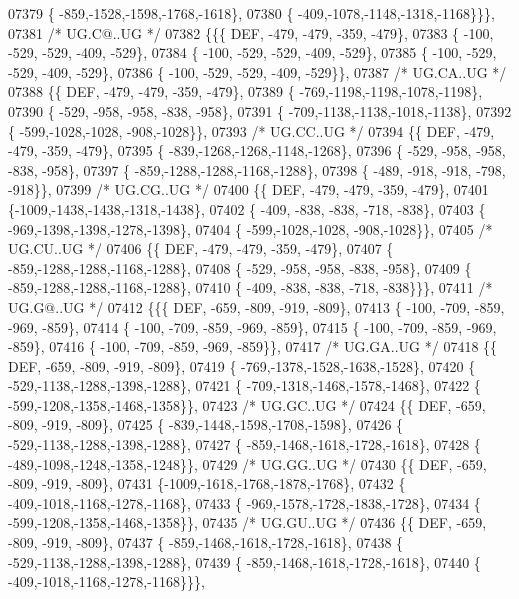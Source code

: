 \begin{DoxyCode}
07379 \{ -859,-1528,-1598,-1768,-1618\},
07380 \{ -409,-1078,-1148,-1318,-1168\}\}\},
07381 \textcolor{comment}{/* UG.C@..UG */}
07382 \{\{\{  DEF, -479, -479, -359, -479\},
07383 \{ -100, -529, -529, -409, -529\},
07384 \{ -100, -529, -529, -409, -529\},
07385 \{ -100, -529, -529, -409, -529\},
07386 \{ -100, -529, -529, -409, -529\}\},
07387 \textcolor{comment}{/* UG.CA..UG */}
07388 \{\{  DEF, -479, -479, -359, -479\},
07389 \{ -769,-1198,-1198,-1078,-1198\},
07390 \{ -529, -958, -958, -838, -958\},
07391 \{ -709,-1138,-1138,-1018,-1138\},
07392 \{ -599,-1028,-1028, -908,-1028\}\},
07393 \textcolor{comment}{/* UG.CC..UG */}
07394 \{\{  DEF, -479, -479, -359, -479\},
07395 \{ -839,-1268,-1268,-1148,-1268\},
07396 \{ -529, -958, -958, -838, -958\},
07397 \{ -859,-1288,-1288,-1168,-1288\},
07398 \{ -489, -918, -918, -798, -918\}\},
07399 \textcolor{comment}{/* UG.CG..UG */}
07400 \{\{  DEF, -479, -479, -359, -479\},
07401 \{-1009,-1438,-1438,-1318,-1438\},
07402 \{ -409, -838, -838, -718, -838\},
07403 \{ -969,-1398,-1398,-1278,-1398\},
07404 \{ -599,-1028,-1028, -908,-1028\}\},
07405 \textcolor{comment}{/* UG.CU..UG */}
07406 \{\{  DEF, -479, -479, -359, -479\},
07407 \{ -859,-1288,-1288,-1168,-1288\},
07408 \{ -529, -958, -958, -838, -958\},
07409 \{ -859,-1288,-1288,-1168,-1288\},
07410 \{ -409, -838, -838, -718, -838\}\}\},
07411 \textcolor{comment}{/* UG.G@..UG */}
07412 \{\{\{  DEF, -659, -809, -919, -809\},
07413 \{ -100, -709, -859, -969, -859\},
07414 \{ -100, -709, -859, -969, -859\},
07415 \{ -100, -709, -859, -969, -859\},
07416 \{ -100, -709, -859, -969, -859\}\},
07417 \textcolor{comment}{/* UG.GA..UG */}
07418 \{\{  DEF, -659, -809, -919, -809\},
07419 \{ -769,-1378,-1528,-1638,-1528\},
07420 \{ -529,-1138,-1288,-1398,-1288\},
07421 \{ -709,-1318,-1468,-1578,-1468\},
07422 \{ -599,-1208,-1358,-1468,-1358\}\},
07423 \textcolor{comment}{/* UG.GC..UG */}
07424 \{\{  DEF, -659, -809, -919, -809\},
07425 \{ -839,-1448,-1598,-1708,-1598\},
07426 \{ -529,-1138,-1288,-1398,-1288\},
07427 \{ -859,-1468,-1618,-1728,-1618\},
07428 \{ -489,-1098,-1248,-1358,-1248\}\},
07429 \textcolor{comment}{/* UG.GG..UG */}
07430 \{\{  DEF, -659, -809, -919, -809\},
07431 \{-1009,-1618,-1768,-1878,-1768\},
07432 \{ -409,-1018,-1168,-1278,-1168\},
07433 \{ -969,-1578,-1728,-1838,-1728\},
07434 \{ -599,-1208,-1358,-1468,-1358\}\},
07435 \textcolor{comment}{/* UG.GU..UG */}
07436 \{\{  DEF, -659, -809, -919, -809\},
07437 \{ -859,-1468,-1618,-1728,-1618\},
07438 \{ -529,-1138,-1288,-1398,-1288\},
07439 \{ -859,-1468,-1618,-1728,-1618\},
07440 \{ -409,-1018,-1168,-1278,-1168\}\}\},

\end{DoxyCode}
